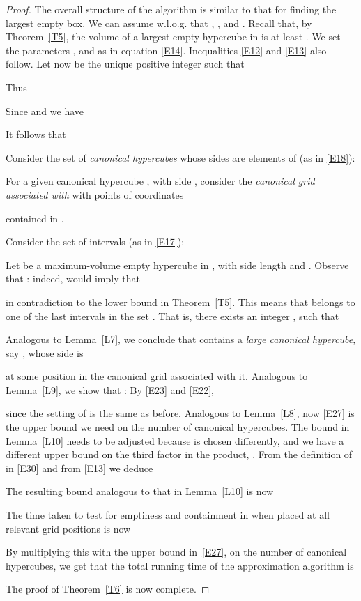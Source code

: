 \documentclass[11pt]{article}
\begin{document}
\begin{proof} The overall structure of the algorithm is
similar to that for finding the largest empty box. 
We can assume w.l.o.g. that , , and . 
Recall that, by Theorem~\ref{T5}, the volume of a largest empty
hypercube in  is at least .  
We set the parameters ,  and  as in equation \eqref{E14}. 
Inequalities \eqref{E12} and \eqref{E13} also follow.
Let now  be the unique positive integer such that
 
Thus 

Since  and  we have 

It follows that 
 


Consider the set  of  {\em canonical hypercubes} whose sides
are elements of  (as in \eqref{E18}):
 


For a given canonical hypercube , with side ,
consider the {\em canonical grid associated with } 
with points of coordinates 
 
contained in . 

Consider the set  of  intervals (as in \eqref{E17}): 
 


Let  be a maximum-volume empty hypercube in , with side
length  and . Observe that : 
indeed,  would imply that 

in contradiction to the lower bound in Theorem~\ref{T5}. 
This means that  belongs to one of the last  intervals in the
set . That is, there exists an integer , such that 
 

Analogous to Lemma~\ref{L7}, we conclude that  contains a 
{\em large canonical hypercube}, say , whose side is
 
at some position in the canonical grid associated with it. 
Analogous to Lemma~\ref{L9}, we show that 
:
By \eqref{E23} and \eqref{E22}, 

since the setting of  is the same as before. 
Analogous to Lemma~\ref{L8}, now \eqref{E27} is the upper bound we
need on the number of canonical hypercubes. 
The bound in Lemma~\ref{L10} needs to be adjusted because  is
chosen differently, and we have a different upper bound on the third
factor in the product, . From the definition of  in
\eqref{E30} and from \eqref{E13} we deduce 

The resulting bound analogous to that in Lemma~\ref{L10} is now
 


The time taken to test  for emptiness and containment in  when
placed at all relevant grid positions is now
 


By multiplying this with the upper bound in~\eqref{E27}, 
on the number of canonical hypercubes, we get that the total
running time of the approximation algorithm is 

The proof of Theorem~\ref{T6} is now complete.
\end{proof}
\end{document}
